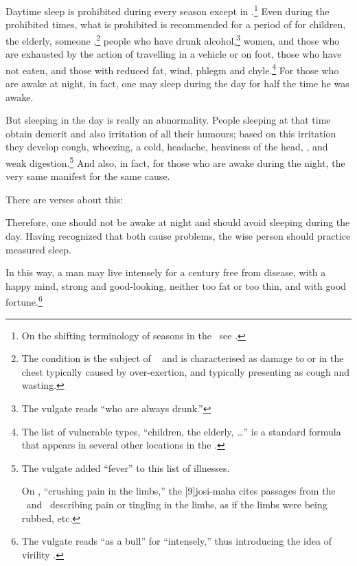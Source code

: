 \begin{translation}
Daytime sleep is prohibited during every season except in
.\footnote{On the shifting terminology of seasons
    in the \SS\ see \cite{ange-2022}.} Even during the prohibited times,
    what is prohibited is recommended for a period of  for children, the elderly, someone
    ,\footnote{\label{angamarda}The
        condition is the subject of \CS\  and is
        characterised as damage to or in the chest typically caused by
        over-exertion, and typically presenting as cough and wasting.} people
        who have drunk alcohol,\footnote{The vulgate reads “who are always
            drunk.”} women, and those who are exhausted by the action of
            travelling in a vehicle or on foot, those who have not eaten, and
            those with reduced fat, wind, phlegm and chyle.\footnote{The list of
                vulnerable types, “children, the elderly, \ldots” is a standard
                formula that appears in several other locations in the \SS.} %
                For those who are awake at night, in fact, one may
                sleep during the day for half the time he was awake.

But sleeping in the day is really an abnormality. People sleeping at
that time obtain demerit and also irritation of all their humours;
based on this irritation they develop cough, wheezing, a cold,
headache, heaviness of the head, ,  and weak
digestion.\footnote{The vulgate added “fever” to this list of
    illnesses.
    
    On , “crushing pain in the limbs,” the
[9]{josi-maha} cites passages from the \SS\ and \CS\
describing pain or tingling in the limbs, as if the limbs were
being rubbed, etc.}  And also, in fact, for those who
are awake during the night, the very same 
manifest for the same cause.

\item[39]

There are verses about this:
\begin{sloka}
    Therefore, one should not be awake at night and should avoid sleeping 
    during the day.  Having recognized that both cause problems, 
    the wise person should practice measured sleep.   
\end{sloka}

\item[40]
\begin{sloka}    In this way, a man may live intensely for a century free from
disease, with a happy mind,  strong and good-looking, neither too
fat or too thin, and with good fortune.\footnote{The vulgate reads
    \dev{vṛṣaḥ} “as a bull” for \dev{bhṛśam} “intensely,” thus
    introducing the idea of virility \citep[359]{vulgate}.}
\end{sloka}


\end{translation}

